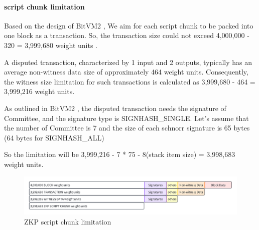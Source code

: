 \paragraph*{script chunk limitation}

Based on the design of BitVM2 \cite{website:BitVM2}, We aim for each script chunk to be packed into one block as a transaction.
So, the transaction size could not exceed 4,000,000 - 320 = 3,999,680 weight units \cite{website:transaction-size}.

A disputed transaction, characterized by 1 input and 2 outputs, typically has an average non-witness data size of approximately 464 weight units. 
Consequently, the witness size limitation for such transactions is calculated as 3,999,680 - 464 = 3,999,216 weight units.

As outlined in BitVM2 \cite{website:BitVM2}, the disputed transaction needs the signature of Committee, and the signature type is
SIGNHASH\_SINGLE. Let's assume that the number of Committee is 7 and the size of each schnorr signature is 65 bytes (64 bytes for SIGNHASH\_ALL)

So the limitation will be 3,999,216 - 7 * 75 - 8(stack item size) = 3,998,683 weight units.

\begin{figure}[ht] 
    \centering  
    \includegraphics[width=0.85\columnwidth]{images/ZKP-script-chunk-limitation.png} 
    \caption{ZKP script chunk limitation}
    \label{fig:ZKP-script-chunk-limitation}
\end{figure}
